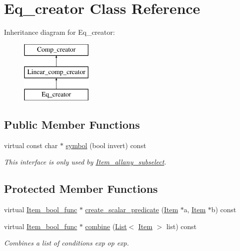 \hypertarget{classEq__creator}{}\section{Eq\+\_\+creator Class Reference}
\label{classEq__creator}
Inheritance diagram for Eq\+\_\+creator\+:\begin{figure}[H]
\begin{center}
\leavevmode
\includegraphics[height=3.000000cm]{classEq__creator}
\end{center}
\end{figure}
\subsection*{Public Member Functions}
\begin{DoxyCompactItemize}
\item 
\mbox{\label{classEq__creator_a0d73e4d7d2643ebe8964eeb5835092d2}} 
virtual const char $\ast$ \mbox{\hyperlink{classEq__creator_a0d73e4d7d2643ebe8964eeb5835092d2}{symbol}} (bool invert) const
\begin{DoxyCompactList}\small\item\em This interface is only used by \mbox{\hyperlink{classItem__allany__subselect}{Item\+\_\+allany\+\_\+subselect}}. \end{DoxyCompactList}\end{DoxyCompactItemize}
\subsection*{Protected Member Functions}
\begin{DoxyCompactItemize}
\item 
virtual \mbox{\hyperlink{classItem__bool__func}{Item\+\_\+bool\+\_\+func}} $\ast$ \mbox{\hyperlink{classEq__creator_ac63960f7bc029779aba59e9492663e2d}{create\+\_\+scalar\+\_\+predicate}} (\mbox{\hyperlink{classItem}{Item}} $\ast$a, \mbox{\hyperlink{classItem}{Item}} $\ast$b) const
\item 
\mbox{\label{classEq__creator_a0dcce0a625767935c3a5e0c7ecc41e7d}} 
virtual \mbox{\hyperlink{classItem__bool__func}{Item\+\_\+bool\+\_\+func}} $\ast$ \mbox{\hyperlink{classEq__creator_a0dcce0a625767935c3a5e0c7ecc41e7d}{combine}} (\mbox{\hyperlink{classList}{List}}$<$ \mbox{\hyperlink{classItem}{Item}} $>$ list) const
\begin{DoxyCompactList}\small\item\em Combines a list of conditions {\ttfamily exp op exp}. \end{DoxyCompactList}\end{DoxyCompactItemize}


